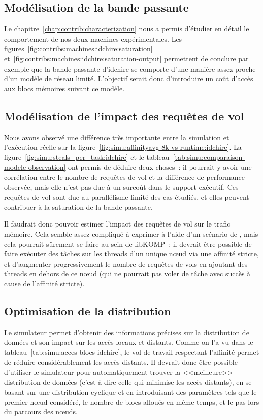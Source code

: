 \subsection{Modélisation de la bande passante}

Le chapitre~\ref{chap:contrib:characterization} nous a permis d'étudier en détail le comportement de nos deux machines expérimentales.
Les figures~\ref{fig:contribs:machines:idchire:saturation} et~\ref{fig:contribs:machines:idchire:saturation-output} permettent de conclure par exemple que la bande passante d'idchire se comporte d'une manière assez proche d'un modèle de réseau limité.
L'objectif serait donc d'introduire un coût d'accès aux blocs mémoires suivant ce modèle.

\subsection{Modélisation de l'impact des requêtes de vol}

Nous avons observé une différence très importante entre la simulation et l'exécution réelle sur la figure~\ref{fig:simu:affinityavg-8k-vs-runtime:idchire}.
La figure~\ref{fig:simu:steals_per_task:idchire} et le tableau~\ref{tab:simu:comparaison-modele-observation} ont permis de déduire deux choses~: il pourrait y avoir une corrélation entre le nombre de requêtes de vol et la différence de performance observée, mais elle n'est pas due à un surcoût dans le support exécutif.
Ces requêtes de vol sont due au parallélisme limité des cas étudiés, et elles peuvent contribuer à la saturation de la bande passante.

Il faudrait donc pouvoir estimer l'impact des requêtes de vol sur le trafic mémoire.
Cela semble assez compliqué à exprimer à l'aide d'un scénario de \outil, mais cela pourrait sûrement se faire au sein de libKOMP~: il devrait être possible de faire exécuter des tâches sur les threads d'un unique nœud via une affinité stricte, et d'augmenter progressivement le nombre de requêtes de vols en ajoutant des threads en dehors de ce nœud (qui ne pourrait pas voler de tâche avec succès à cause de l'affinité stricte).


\subsection{Optimisation de la distribution}

Le simulateur permet d'obtenir des informations précises sur la distribution de données et son impact sur les accès locaux et distants.
Comme on l'a vu dans le tableau~\ref{tab:simu:acces-blocs-idchire}, le vol de travail respectant l'affinité permet de réduire considérablement les accès distants.
Il devrait donc être possible d'utiliser le simulateur pour automatiquement trouver la <<meilleure>> distribution de données (c'est à dire celle qui minimise les accès distants), en se basant sur une distribution cyclique et en introduisant des paramètres tels que le premier nœud considéré, le nombre de blocs alloués en même temps, et le pas lors du parcours des nœuds.
